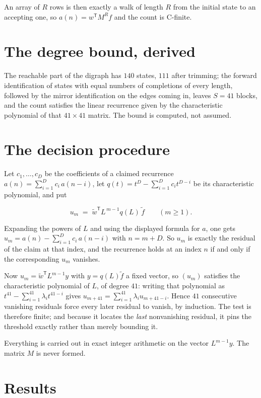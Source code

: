 \documentclass[11pt]{article}
\theoremstyle{definition}
\begin{document}
An array of $R$ rows is then exactly a walk of length $R$ from the initial state to an accepting one, so $a(n) = w^{\mathsf T}M^{R}f$ and the count is C-finite.

\section{The degree bound, derived}

The reachable part of the digraph has $140$ states, $111$ after trimming; the forward identification of states with equal numbers of completions of every length, followed by the mirror identification on the edges coming in, leaves $S = 41$ blocks, and the count satisfies the linear recurrence given by the characteristic polynomial of that $41\times41$ matrix. The bound is computed, not assumed.

\section{The decision procedure}

Let $c_1,\dots,c_D$ be the coefficients of a claimed recurrence $a(n) = \sum_{i=1}^{D} c_i\,a(n-i)$, let $q(t) = t^{D} - \sum_{i=1}^{D} c_i t^{D-i}$ be its characteristic polynomial, and put

\[u_m \;=\; \tilde w^{\mathsf T} L^{\,m-1} q(L)\,\tilde f \qquad (m \ge 1).\]

Expanding the powers of $L$ and using the displayed formula for $a$, one gets $u_m = a(n) - \sum_{i=1}^{D} c_i\,a(n-i)$ with $n = m + D$. So $u_m$ is exactly the residual of the claim at that index, and the recurrence holds at an index $n$ if and only if the corresponding $u_m$ vanishes.

Now $u_m = \tilde w^{\mathsf T} L^{m-1} y$ with $y = q(L)\tilde f$ a fixed vector, so $(u_m)$ satisfies the characteristic polynomial of $L$, of degree $41$: writing that polynomial as $t^{41} - \sum_{i=1}^{41} \lambda_i t^{41-i}$ gives $u_{m+41} = \sum_{i=1}^{41} \lambda_i u_{m+41-i}$. Hence $41$ consecutive vanishing residuals force every later residual to vanish, by induction. The test is therefore finite; and because it locates the {\itshape last} nonvanishing residual, it pins the threshold exactly rather than merely bounding it.

Everything is carried out in exact integer arithmetic on the vector $L^{m-1}y$. The matrix $M$ is never formed.

\section{Results}
\end{document}
